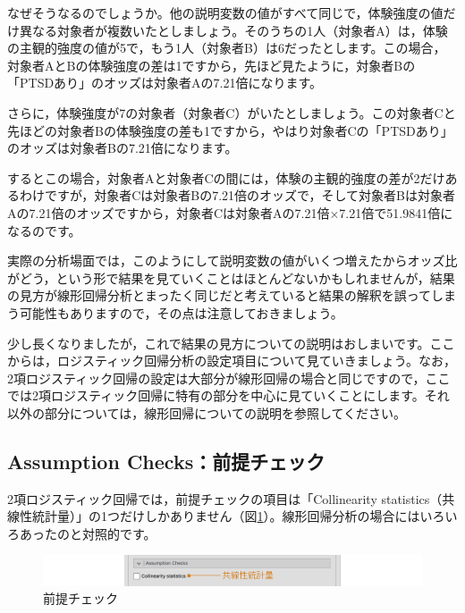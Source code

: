 \documentclass[
  12pt,
  a5jpaper,
  lualatex, ja=standard]{bxjsbook}
\begin{document}
なぜそうなるのでしょうか。他の説明変数の値がすべて同じで，体験強度の値だけ異なる対象者が複数いたとしましょう。そのうちの1人（対象者A）は，体験の主観的強度の値が5で，もう1人（対象者B）は6だったとします。この場合，対象者AとBの体験強度の差は1ですから，先ほど見たように，対象者Bの「PTSDあり」のオッズは対象者Aの7.21倍になります。

さらに，体験強度が7の対象者（対象者C）がいたとしましょう。この対象者Cと先ほどの対象者Bの体験強度の差も1ですから，やはり対象者Cの「PTSDあり」のオッズは対象者Bの7.21倍になります。

するとこの場合，対象者Aと対象者Cの間には，体験の主観的強度の差が2だけあるわけですが，対象者Cは対象者Bの7.21倍のオッズで，そして対象者Bは対象者Aの7.21倍のオッズですから，対象者Cは対象者Aの7.21倍×7.21倍で51.9841倍になるのです。

実際の分析場面では，このようにして説明変数の値がいくつ増えたからオッズ比がどう，という形で結果を見ていくことはほとんどないかもしれませんが，結果の見方が線形回帰分析とまったく同じだと考えていると結果の解釈を誤ってしまう可能性もありますので，その点は注意しておきましょう。

少し長くなりましたが，これで結果の見方についての説明はおしまいです。ここからは，ロジスティック回帰分析の設定項目について見ていきましょう。なお，2項ロジスティック回帰の設定は大部分が線形回帰の場合と同じですので，ここでは2項ロジスティック回帰に特有の部分を中心に見ていくことにします。それ以外の部分については，線形回帰についての説明を参照してください。

\hypertarget{sub:regression-binomial-assumption}{%
\subsection{Assumption Checks：前提チェック}\label{sub:regression-binomial-assumption}}

2項ロジスティック回帰では，前提チェックの項目は「Collinearity statistics（共線性統計量）」の1つだけしかありません（図\ref{fig:regression-binomial-assumption-checks}）。線形回帰分析の場合にはいろいろあったのと対照的です。

\begin{figure}[!ht]

{\centering \includegraphics[width=1\linewidth]{images/regression/binomial-assumption-checks} 

}

\caption{前提チェック}\label{fig:regression-binomial-assumption-checks}
\end{figure}
\end{document}
